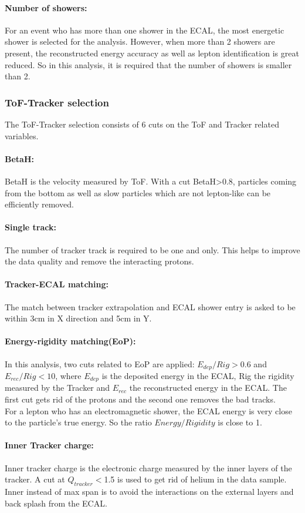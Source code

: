 \paragraph{Number of showers:} For an event who has more than one shower in the ECAL, the most energetic shower is selected for the analysis. However, when more than 2 showers are present, the reconstructed energy accuracy as well as lepton identification is great reduced. So in this analysis, it is required that the number of showers is smaller than 2.
\subsubsection{ToF-Tracker selection}
The ToF-Tracker selection consists of 6 cuts on the ToF and Tracker related variables.
\paragraph{BetaH:} BetaH is the velocity measured by ToF. With a cut BetaH>0.8, particles coming from the bottom as well as slow particles which are not lepton-like can be efficiently removed.
\paragraph{Single track:} The number of tracker track is required to be one and only. This helps to improve the data quality and remove the interacting protons.
\paragraph{Tracker-ECAL matching:} The match between tracker extrapolation and ECAL shower entry is asked to be within 3cm in X direction and 5cm in Y.
\paragraph{Energy-rigidity matching(EoP):} In this analysis, two cuts related to EoP are applied: $E_{dep}/Rig>0.6$ and $E_{rec}/Rig<10$, where $E_{dep}$ is the deposited energy in the ECAL, Rig the rigidity measured by the Tracker and $E_{rec}$ the reconstructed energy in the ECAL. The first cut gets rid of the protons and the second one removes the bad tracks.\\
For a lepton who has an electromagnetic shower, the ECAL energy is very close to the particle's true energy. So the ratio $Energy/Rigidity$ is close to 1.
\paragraph{Inner Tracker charge:} Inner tracker charge is the electronic charge measured by the inner layers of the tracker. A cut at $Q_{tracker}<$1.5 is used to get rid of helium in the data sample. Inner instead of max span is to avoid the interactions on the external layers and back splash from the ECAL.\\

